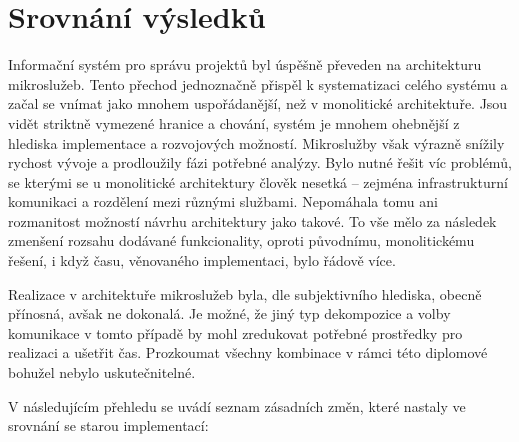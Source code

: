 \chapter{Srovnání výsledků}\label{ch:compare}


Informační systém pro správu projektů byl úspěšně převeden na architekturu mikroslužeb.
Tento přechod jednoznačně přispěl k systematizaci celého systému a začal se vnímat jako mnohem uspořádanější, než v monolitické architektuře.
Jsou vidět striktně vymezené hranice a chování, systém je mnohem ohebnější z hlediska implementace a rozvojových možností.
Mikroslužby však výrazně snížily rychost vývoje a prodloužily fázi potřebné analýzy.
Bylo nutné řešit víc problémů, se kterými se u monolitické architektury člověk nesetká – zejména infrastrukturní komunikaci a rozdělení  mezi různými službami.
Nepomáhala tomu ani rozmanitost možností návrhu architektury jako takové.
To vše mělo za následek zmenšení rozsahu dodávané funkcionality, oproti původnímu, monolitickému řešení, i když času, věnovaného implementaci, bylo řádově více.

Realizace  v architektuře mikroslužeb byla, dle subjektivního hlediska, obecně přínosná, avšak ne dokonalá.
Je možné, že jiný typ dekompozice a volby komunikace v tomto případě by mohl zredukovat potřebné prostředky pro realizaci a ušetřit čas.
Prozkoumat všechny kombinace v rámci této diplomové bohužel nebylo uskutečnitelné.

\newpage

V následujícím přehledu se uvádí seznam zásadních změn, které nastaly ve srovnání se starou implementací:

